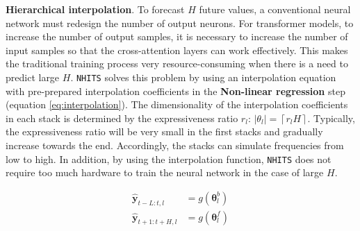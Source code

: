 
\textbf{Hierarchical interpolation}. To forecast $H$ future values, a conventional neural network must redesign the number of output neurons. For transformer models, to increase the number of output samples, it is necessary to increase the number of input samples so that the cross-attention layers can work effectively. This makes the traditional training process very resource-consuming when there is a need to predict large $H$. \verb|NHITS| solves this problem by using an interpolation equation with pre-prepared interpolation coefficients in the \textbf{Non-linear regression} step (equation \ref{eq:interpolation}). The dimensionality of the interpolation coefficients in each stack is determined by the expressiveness ratio $r_l$: $\left| \theta_l \right| = \left \lceil r_l H \right \rceil$. Typically, the expressiveness ratio will be very small in the first stacks and gradually increase towards the end. Accordingly, the stacks can simulate frequencies from low to high. In addition, by using the interpolation function, \verb|NHITS| does not require too much hardware to train the neural network in the case of large $H$.

\begin{align}
    \mathbf{\hat{y}}_{t-L:t, l} &= g\left(\mathbf{\theta}_l^b\right)\\
    \mathbf{\hat{y}}_{t+1:t+H, l} &= g\left(\mathbf{\theta}_l^f\right)
    \label{eq:interpolation}
\end{align}


